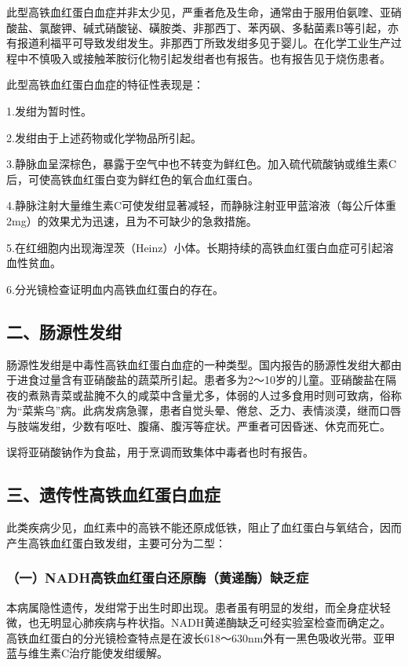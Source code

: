 此型高铁血红蛋白血症并非太少见，严重者危及生命，通常由于服用伯氨喹、亚硝酸盐、氯酸钾、碱式硝酸铋、磺胺类、非那西丁、苯丙砜、多黏菌素B等引起，亦有报道利福平可导致发绀发生。非那西丁所致发绀多见于婴儿。在化学工业生产过程中不慎吸入或接触苯胺衍化物引起发绀者也有报告。也有报告见于烧伤患者。

此型高铁血红蛋白血症的特征性表现是：

1.发绀为暂时性。

2.发绀由于上述药物或化学物品所引起。

3.静脉血呈深棕色，暴露于空气中也不转变为鲜红色。加入硫代硫酸钠或维生素C后，可使高铁血红蛋白变为鲜红色的氧合血红蛋白。

4.静脉注射大量维生素C可使发绀显著减轻，而静脉注射亚甲蓝溶液（每公斤体重2mg）的效果尤为迅速，且为不可缺少的急救措施。

5.在红细胞内出现海涅茨（Heinz）小体。长期持续的高铁血红蛋白血症可引起溶血性贫血。

6.分光镜检查证明血内高铁血红蛋白的存在。

\subsection{二、肠源性发绀}

肠源性发绀是中毒性高铁血红蛋白血症的一种类型。国内报告的肠源性发绀大都由于进食过量含有亚硝酸盐的蔬菜所引起。患者多为2～10岁的儿童。亚硝酸盐在隔夜的煮熟青菜或盐腌不久的咸菜中含量尤多，体弱的人过多食用时则可致病，俗称为“菜紫乌”病。此病发病急骤，患者自觉头晕、倦怠、乏力、表情淡漠，继而口唇与肢端发绀，少数有呕吐、腹痛、腹泻等症状。严重者可因昏迷、休克而死亡。

误将亚硝酸钠作为食盐，用于烹调而致集体中毒者也时有报告。

\subsection{三、遗传性高铁血红蛋白血症}

此类疾病少见，血红素中的高铁不能还原成低铁，阻止了血红蛋白与氧结合，因而产生高铁血红蛋白致发绀，主要可分为二型：

\subsubsection{（一）NADH高铁血红蛋白还原酶（黄递酶）缺乏症}

本病属隐性遗传，发绀常于出生时即出现。患者虽有明显的发绀，而全身症状轻微，也无明显心肺疾病与杵状指。NADH黄递酶缺乏可经实验室检查而确定之。高铁血红蛋白的分光镜检查特点是在波长618～630nm外有一黑色吸收光带。亚甲蓝与维生素C治疗能使发绀缓解。

